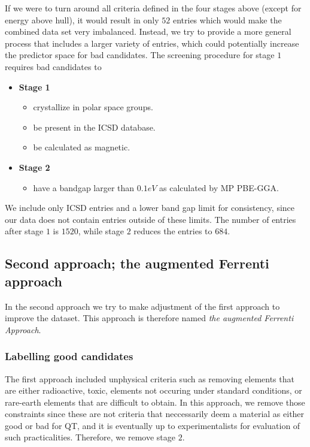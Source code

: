 If we were to turn around all criteria defined in the four stages above (except for energy above hull), it would result in only $52$ entries which would make the combined data set very imbalanced. Instead, we try to provide a more general process that includes a larger variety of entries, which could potentially increase the predictor space for bad candidates. The screening procedure for stage $1$ requires bad candidates to

\begin{itemize}
  \item[]{\textbf{Stage 1}}
  \begin{itemize}
  \item crystallize in polar space groups.
  \item be present in the ICSD database.
  \item be calculated as magnetic.
  \end{itemize}
  \item[]{\textbf{Stage 2}}
  \begin{itemize}
  \item have a bandgap larger than $0.1eV$ as calculated by MP PBE-GGA.
  \end{itemize}
\end{itemize}

We include only ICSD entries and a lower band gap limit for consistency, since our data does not contain entries outside of these limits. The number of entries after stage $1$ is $1520$, while stage $2$ reduces the entries to $684$.

\subsection{Second approach; the augmented Ferrenti approach}

In the second approach we try to make adjustment of the first approach to improve the dataset. This approach is therefore named \textit{the augmented Ferrenti Approach}.

\subsubsection{Labelling good candidates}

The first approach included unphysical criteria such as removing elements that are either radioactive, toxic, elements not occuring under standard conditions, or rare-earth elements that are difficult to obtain. In this approach, we remove those constraints since these are not criteria that neccessarily deem a material as either good or bad for QT, and it is eventually up to experimentalists for evaluation of such practicalities. Therefore, we remove stage $2$.

